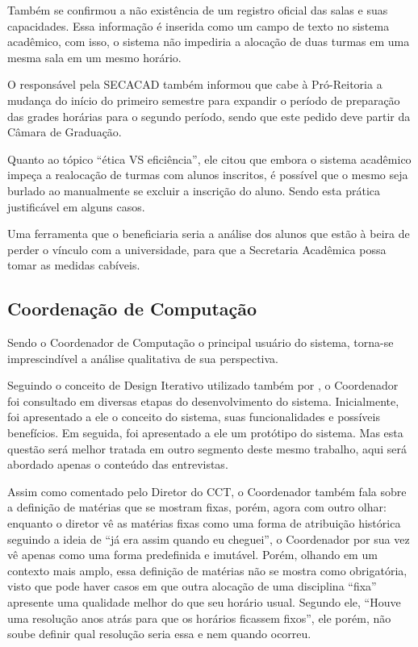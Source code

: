 Também se confirmou a não existência de um registro oficial das salas e suas capacidades. Essa informação é inserida como um campo de texto no sistema acadêmico, com isso, o sistema não impediria a alocação de duas turmas em uma mesma sala em um mesmo horário.

O responsável pela SECACAD também informou que cabe à Pró-Reitoria a mudança do início do primeiro semestre para expandir o período de preparação das grades horárias para o segundo período, sendo que este pedido deve partir da Câmara de Graduação.

Quanto ao tópico ``ética VS eficiência'', ele citou que embora o sistema acadêmico impeça a realocação de turmas com alunos inscritos, é possível que o mesmo seja burlado ao manualmente se excluir a inscrição do aluno. Sendo esta prática justificável em alguns casos.

Uma ferramenta que o beneficiaria seria a análise dos alunos que estão à beira de perder o vínculo com a universidade, para que a Secretaria Acadêmica possa tomar as medidas cabíveis.

\subsection{Coordenação de Computação} \label{ssec:3_Coordenador} %

Sendo o Coordenador de Computação o principal usuário do sistema, torna-se imprescindível a análise qualitativa de sua perspectiva.

Seguindo o conceito de Design Iterativo utilizado também por , o Coordenador foi consultado em diversas etapas do desenvolvimento do sistema. Inicialmente, foi apresentado a ele o conceito do sistema, suas funcionalidades e possíveis benefícios. Em seguida, foi apresentado a ele um protótipo do sistema. Mas esta questão será melhor tratada em outro segmento deste mesmo trabalho, aqui será abordado apenas o conteúdo das entrevistas.

Assim como comentado pelo Diretor do CCT, o Coordenador também fala sobre a definição de matérias que se mostram fixas, porém, agora com outro olhar: enquanto o diretor vê as matérias fixas como uma forma de atribuição histórica seguindo a ideia de ``já era assim quando eu cheguei'', o Coordenador por sua vez vê apenas como uma forma predefinida e imutável. Porém, olhando em um contexto mais amplo, essa definição de matérias não se mostra como obrigatória, visto que pode haver casos em que outra alocação de uma disciplina ``fixa'' apresente uma qualidade melhor do que seu horário usual. Segundo ele, ``Houve uma resolução anos atrás para que os horários ficassem fixos'', ele porém, não soube definir qual resolução seria essa e nem quando ocorreu.


